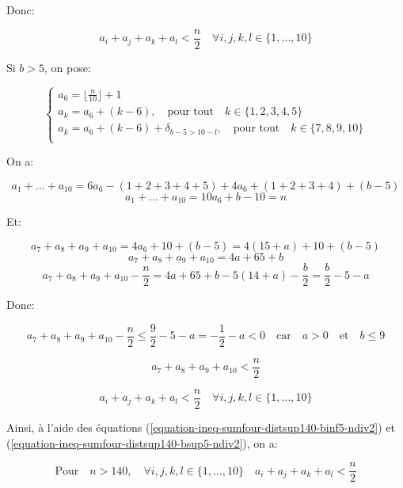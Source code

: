 \documentclass[12pt,a4paper,article]{memoir}
\newcommand{\floor}[1]{\lfloor #1 \rfloor}
\begin{document}
Donc:

\begin{equation}
a_{i} + a_{j} + a_{k} + a_{l} < \frac{n}{2} \quad \forall i, j, k, l \in \{1, ..., 10\}
\label{equation-ineq-sumfour-distsup140-binf5-ndiv2}
\end{equation}

\bigskip

Si $b > 5$, on pose:

\begin{equation}
\left\{
	\begin{array}{l}
	a_{6} = \floor{\frac{n}{10}} + 1\\
	a_{k} = a_{6} + (k - 6), \quad \textrm{pour tout} \quad k \in \{1, 2, 3, 4, 5\}\\
	a_{k} = a_{6} + (k - 6) + \delta_{b - 5 > 10 - l}, \quad \textrm{pour tout} \quad k \in \{7, 8, 9, 10\}\\
	\end{array}
\right.
\label{equation-def-exp-distsup140-bsup5}
\end{equation}

On a:

\[a_{1} + ... + a_{10} = 6a_{6} - (1+ 2 + 3 + 4 + 5) + 4a_{6} + (1 + 2 + 3 + 4) + (b - 5)\]
\[a_{1} + ... + a_{10} = 10a_{6} + b - 10 = n \]

Et:

\[a_{7} + a_{8} + a_{9} + a_{10} = 4a_{6} + 10 + (b - 5) = 4(15 + a) + 10 + (b - 5) \]
\[a_{7} + a_{8} + a_{9} + a_{10} = 4a + 65 + b\]
\[a_{7} + a_{8} + a_{9} + a_{10} - \frac{n}{2} = 4a + 65 + b - 5(14 + a) - \frac{b}{2} = \frac{b}{2} - 5 - a\]

Donc:

\[a_{7} + a_{8} + a_{9} + a_{10} - \frac{n}{2} \leq \frac{9}{2} - 5 - a = -\frac{1}{2} - a < 0 \quad \textrm{car} \quad a > 0 \quad \textrm{et} \quad b \leq 9\]

\[a_{7} + a_{8} + a_{9} + a_{10} < \frac{n}{2}\]

\begin{equation}
a_{i} + a_{j} + a_{k} + a_{l} < \frac{n}{2} \quad \forall i, j, k, l \in \{1, ..., 10\}
\label{equation-ineq-sumfour-distsup140-bsup5-ndiv2}
\end{equation}

\bigskip

Ainsi, à l'aide des équations (\ref{equation-ineq-sumfour-distsup140-binf5-ndiv2}) et (\ref{equation-ineq-sumfour-distsup140-bsup5-ndiv2}), on a:

\begin{equation}
\textrm{Pour} \quad n > 140, \quad \forall i, j, k, l \in \{1, ..., 10\} \quad a_{i} + a_{j} + a_{k} + a_{l} < \frac{n}{2}
\label{equation-ineq-sumfour-distsup140-ndiv2}
\end{equation}
\end{document}
